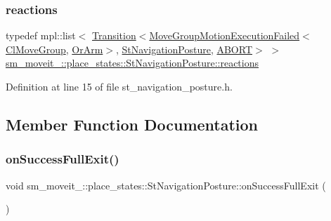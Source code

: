 \subsubsection{\texorpdfstring{reactions}{reactions}}
{\footnotesize\ttfamily typedef mpl\+::list$<$ \hyperlink{classsmacc_1_1Transition}{Transition}$<$\hyperlink{structmoveit__z__client_1_1MoveGroupMotionExecutionFailed}{Move\+Group\+Motion\+Execution\+Failed}$<$\hyperlink{classmoveit__z__client_1_1ClMoveGroup}{Cl\+Move\+Group}, \hyperlink{classsm__moveit__4_1_1OrArm}{Or\+Arm}$>$, \hyperlink{structsm__moveit__4_1_1place__states_1_1StNavigationPosture}{St\+Navigation\+Posture}, \hyperlink{structsmacc_1_1default__transition__tags_1_1ABORT}{A\+B\+O\+RT}$>$ $>$ \hyperlink{structsm__moveit__4_1_1place__states_1_1StNavigationPosture_a2588352d77d56f7a1f3df49fe37629d4}{sm\+\_\+moveit\+\_\+::place\+\_\+states\+::\+St\+Navigation\+Posture\+::reactions}}



Definition at line 15 of file st\+\_\+navigation\+\_\+posture.\+h.



\subsection{Member Function Documentation}
\mbox{\label{structsm__moveit__4_1_1place__states_1_1StNavigationPosture_a95ab74dae51538aeae46f71b515bc61e}} 
\subsubsection{\texorpdfstring{on\+Success\+Full\+Exit()}{onSuccessFullExit()}}
{\footnotesize\ttfamily void sm\+\_\+moveit\+\_\+::place\+\_\+states\+::\+St\+Navigation\+Posture\+::on\+Success\+Full\+Exit (\begin{DoxyParamCaption}{ }\end{DoxyParamCaption})\hspace{0.3cm}{\ttfamily [inline]}}



